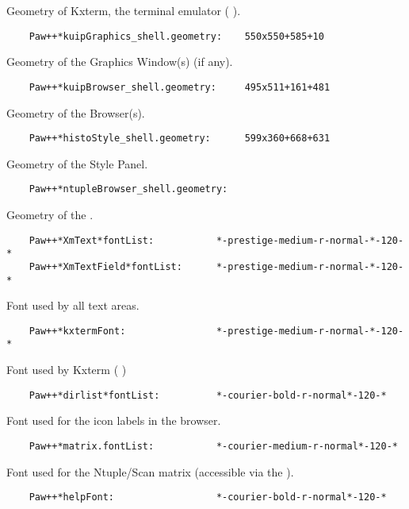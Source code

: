 Geometry of Kxterm, the \KUIP{} terminal emulator (\PAWPP{} \EW).

\begin{verbatim}
    Paw++*kuipGraphics_shell.geometry:    550x550+585+10
\end{verbatim}

   Geometry of the Graphics Window(s) (if any).

\begin{verbatim}
    Paw++*kuipBrowser_shell.geometry:     495x511+161+481
\end{verbatim}

   Geometry of the Browser(s).

\begin{verbatim}
    Paw++*histoStyle_shell.geometry:      599x360+668+631
\end{verbatim}

   Geometry of the Style Panel.

\begin{verbatim}
    Paw++*ntupleBrowser_shell.geometry:
\end{verbatim}

   Geometry of the \NV.

\begin{verbatim}
    Paw++*XmText*fontList:           *-prestige-medium-r-normal-*-120-*
    Paw++*XmTextField*fontList:      *-prestige-medium-r-normal-*-120-*
\end{verbatim}

   Font used by all text areas.

\begin{verbatim}
    Paw++*kxtermFont:                *-prestige-medium-r-normal-*-120-*
\end{verbatim}

   Font used by Kxterm (\PAWPP{} \EW)

\begin{verbatim}
    Paw++*dirlist*fontList:          *-courier-bold-r-normal*-120-*
\end{verbatim}

   Font used for the icon labels in the browser.

\begin{verbatim}
    Paw++*matrix.fontList:           *-courier-medium-r-normal*-120-*
\end{verbatim}

   Font used for the Ntuple/Scan matrix (accessible via the \NV).

\begin{verbatim}
    Paw++*helpFont:                  *-courier-bold-r-normal*-120-*
\end{verbatim}

